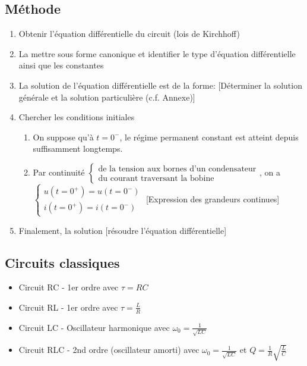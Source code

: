 \documentclass[openany]{book}
\begin{document}
\subsection{Méthode}
\begin{enumerate}
    \item Obtenir l'équation différentielle du circuit (lois de Kirchhoff)
    \item La mettre sous forme canonique et identifier le type d'équation différentielle ainsi que les constantes
    \item La solution de l'équation différentielle est de la forme: [Déterminer la solution générale et la solution particulière (c.f. Annexe)]
    \item Chercher les conditions initiales
        \begin{enumerate}
            \item On suppose qu'à $t = 0^-$, le régime permanent constant est atteint depuis suffisamment longtemps.\\
            \item Par continuité $\begin{cases} \text{de la tension aux bornes d'un condensateur} \\ \text{du courant traversant la bobine} \end{cases}$, on a $\begin{cases} u(t=0^+) = u(t=0^-) \\ i(t=0^+) = i(t=0^-) \end{cases}$ [Expression des grandeurs continues]
        \end{enumerate}
    \item Finalement, la solution [résoudre l'équation différentielle]
\end{enumerate}

\subsection{Circuits classiques}
\begin{itemize}
    \item Circuit RC - 1er ordre avec $\tau = RC$
    \item Circuit RL - 1er ordre avec $\tau = \frac{L}{R}$
    \item Circuit LC - Oscillateur harmonique avec $\omega_0 = \frac{1}{\sqrt{LC}}$
    \item Circuit RLC - 2nd ordre (oscillateur amorti) avec $\omega_0 = \frac{1}{\sqrt{LC}}$ et $Q=\frac{1}{R}\sqrt{\frac{L}{C}}$
\end{itemize}
\end{document}

